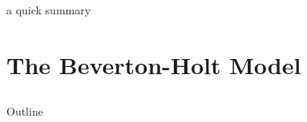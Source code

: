 \documentclass[ xcolor = pdftex, dvipsnames, table ]{beamer}
\begin{document}

%
\begin{frame}
\color{red} a quick summary
\end{frame}

%
\section{The Beverton-Holt Model}
\subsection{}
\begin{frame}{Outline}
\end{frame}
\end{document}
